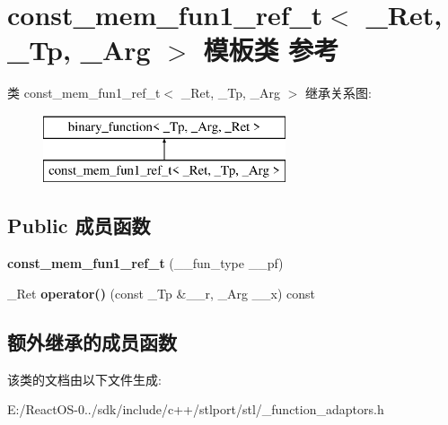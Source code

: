 \hypertarget{classconst__mem__fun1__ref__t}{}\section{const\+\_\+mem\+\_\+fun1\+\_\+ref\+\_\+t$<$ \+\_\+\+Ret, \+\_\+\+Tp, \+\_\+\+Arg $>$ 模板类 参考}
\label{classconst__mem__fun1__ref__t}
类 const\+\_\+mem\+\_\+fun1\+\_\+ref\+\_\+t$<$ \+\_\+\+Ret, \+\_\+\+Tp, \+\_\+\+Arg $>$ 继承关系图\+:\begin{figure}[H]
\begin{center}
\leavevmode
\includegraphics[height=2.000000cm]{classconst__mem__fun1__ref__t}
\end{center}
\end{figure}
\subsection*{Public 成员函数}
\begin{DoxyCompactItemize}
\item 
\mbox{\label{classconst__mem__fun1__ref__t_aa7d4d34b3984f45ec3d8b6d640196a9b}} 
{\bfseries const\+\_\+mem\+\_\+fun1\+\_\+ref\+\_\+t} (\+\_\+\+\_\+fun\+\_\+type \+\_\+\+\_\+pf)
\item 
\mbox{\label{classconst__mem__fun1__ref__t_a48143512ecc888f15d286212b8191dff}} 
\+\_\+\+Ret {\bfseries operator()} (const \+\_\+\+Tp \&\+\_\+\+\_\+r, \+\_\+\+Arg \+\_\+\+\_\+x) const
\end{DoxyCompactItemize}
\subsection*{额外继承的成员函数}


该类的文档由以下文件生成\+:\begin{DoxyCompactItemize}
\item 
E\+:/\+React\+O\+S-\/0../sdk/include/c++/stlport/stl/\+\_\+function\+\_\+adaptors.\+h\end{DoxyCompactItemize}
